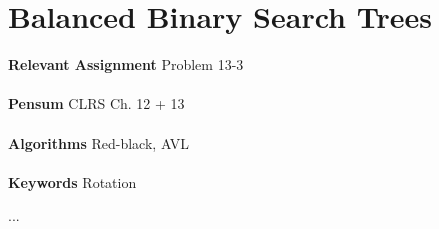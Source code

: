 
\chapter{Balanced Binary Search Trees}
\label{ch:balancedbinarysearchtrees}

\textbf{Relevant Assignment} Problem 13-3\\\\
\textbf{Pensum} CLRS Ch. 12 + 13\\\\
\textbf{Algorithms} Red-black, AVL\\\\
\textbf{Keywords} Rotation
\vspace{1in}

\noindent ...

